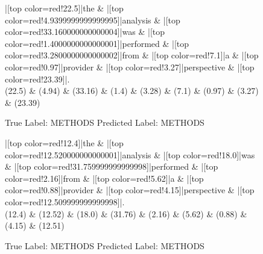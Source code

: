 \documentclass[a4paper, landscape]{article}
\begin{document}
\begin{figure}
\begin{center}
\begin{dependency}
\begin{deptext}
|[top color=red!22.5]|the \& |[top color=red!4.9399999999999995]|analysis \& |[top color=red!33.160000000000004]|was \& |[top color=red!1.4000000000000001]|performed \& |[top color=red!3.2800000000000002]|from \& |[top color=red!7.1]|a \& |[top color=red!0.97]|provider \& |[top color=red!3.27]|perspective \& |[top color=red!23.39]|.\\
(22.5) \& (4.94) \& (33.16) \& (1.4) \& (3.28) \& (7.1) \& (0.97) \& (3.27) \& (23.39)\\
\end{deptext}
\end{dependency}
\end{center}
\caption{True Label: METHODS Predicted Label: METHODS}
\end{figure}
\clearpage
\begin{figure}
\begin{center}
\begin{dependency}
\begin{deptext}
|[top color=red!12.4]|the \& |[top color=red!12.520000000000001]|analysis \& |[top color=red!18.0]|was \& |[top color=red!31.759999999999998]|performed \& |[top color=red!2.16]|from \& |[top color=red!5.62]|a \& |[top color=red!0.88]|provider \& |[top color=red!4.15]|perspective \& |[top color=red!12.509999999999998]|.\\
(12.4) \& (12.52) \& (18.0) \& (31.76) \& (2.16) \& (5.62) \& (0.88) \& (4.15) \& (12.51)\\
\end{deptext}
\end{dependency}
\end{center}
\caption{True Label: METHODS Predicted Label: METHODS}
\end{figure}
\clearpage
\end{document}
